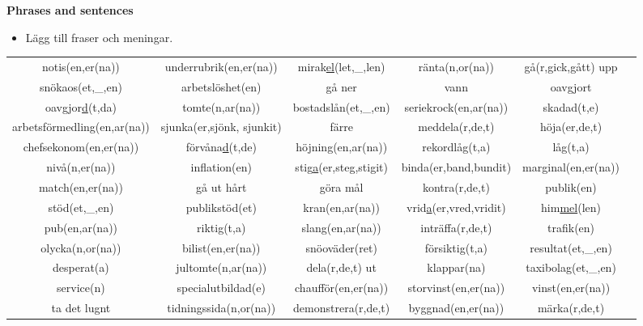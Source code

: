 
\begin{flushleft}
    \textbf{Phrases and sentences}
    \begin{itemize}
        \item Lägg till fraser och meningar.
    \end{itemize}
\end{flushleft}

\begin{center}
    \begin{adjustwidth}{-2.6cm}{}
        \begin{tabular}{|c c c c c c|}
            \hline
            notis(en,er(na)) & underrubrik(en,er(na)) & mirak\underline{el}(let,\_,len) & ränta(n,or(na)) & gå(r,gick,gått) upp &  \\
            snökaos(et,\_,en) & arbetslöshet(en) & gå ner & vann & oavgjort & \\
            oavgjor\underline{d}(t,da) & tomte(n,ar(na)) & bostadslån(et,\_,en) & seriekrock(en,ar(na)) & skadad(t,e) & \\
            arbetsförmedling(en,ar(na)) & sjunka(er,sjönk, sjunkit) & färre & meddela(r,de,t) & höja(er,de,t) & \\
            chefsekonom(en,er(na)) & förvåna\underline{d}(t,de) & höjning(en,ar(na)) & rekordlåg(t,a) & låg(t,a) &  \\
            nivå(n,er(na)) & inflation(en) & stig\underline{a}(er,steg,stigit) & binda(er,band,bundit) & marginal(en,er(na)) &  \\
            match(en,er(na)) & gå ut hårt & göra mål & kontra(r,de,t) & publik(en) &  \\
            stöd(et,\_,en) & publikstöd(et) & kran(en,ar(na)) & vrid\underline{a}(er,vred,vridit) & him\underline{mel}(len) &  \\
            pub(en,ar(na)) & riktig(t,a) & slang(en,ar(na)) & inträffa(r,de,t) & trafik(en) &  \\
            olycka(n,or(na)) & bilist(en,er(na)) & snöoväder(ret) & försiktig(t,a) & resultat(et,\_,en) &  \\
            desperat(a) & jultomte(n,ar(na)) & dela(r,de,t) ut & klappar(na) & taxibolag(et,\_,en) &  \\
            service(n) & specialutbildad(e) & chaufför(en,er(na)) & storvinst(en,er(na)) & vinst(en,er(na)) &  \\
            ta det lugnt & tidningssida(n,or(na)) & demonstrera(r,de,t) & byggnad(en,er(na)) & märka(r,de,t) &  \\

\end{tabular}
\end{adjustwidth}
\end{center}
